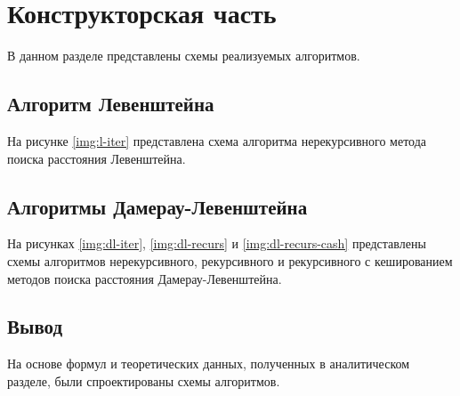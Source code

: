 \chapter{Конструкторская часть}

В данном разделе представлены схемы реализуемых алгоритмов.

\section{Алгоритм Левенштейна}

На рисунке \ref{img:l-iter} представлена схема алгоритма нерекурсивного метода поиска расстояния Левенштейна.


\section{Алгоритмы Дамерау-Левенштейна}

На рисунках \ref{img:dl-iter}, \ref{img:dl-recurs} и \ref{img:dl-recurs-cash} представлены схемы алгоритмов нерекурсивного, рекурсивного и рекурсивного с кешированием методов поиска расстояния Дамерау-Левенштейна.

\clearpage
{}

\section*{Вывод}

На основе формул и теоретических данных, полученных в аналитическом разделе, были спроектированы схемы алгоритмов.
